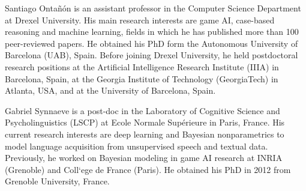 \documentclass[journal]{IEEEtran}
\begin{document}
\ifCLASSOPTIONcaptionsoff
  \newpage
\fi

                                                    






\begin{IEEEbiographynophoto}{Santiago Onta\~{n}\'{o}n}
is an assistant professor in the Computer Science Department at Drexel University. His main research interests are game AI, case-based reasoning and machine learning, fields in which he has published more than 100 peer-reviewed papers. He obtained his PhD form the Autonomous University of Barcelona (UAB), Spain. Before joining Drexel University, he held postdoctoral research positions at the Artificial Intelligence Research Institute (IIIA) in Barcelona, Spain, at the Georgia Institute of Technology (GeorgiaTech) in Atlanta, USA, and at the University of Barcelona, Spain.  
\end{IEEEbiographynophoto}

\begin{IEEEbiographynophoto}{Gabriel Synnaeve}
is a post-doc in the Laboratory of Cognitive Science and Psycholinguistics
(LSCP) at Ecole Normale Sup\'{e}rieure in Paris, France. His current
research interests are deep learning and Bayesian nonparametrics to
model language acquisition from unsupervised speech and textual data.
Previously, he
worked on Bayesian modeling in game AI research at INRIA (Grenoble) and
Coll`{e}ge de France (Paris). He obtained his PhD in 2012 from Grenoble
University, France.
\end{IEEEbiographynophoto}
\end{document}
